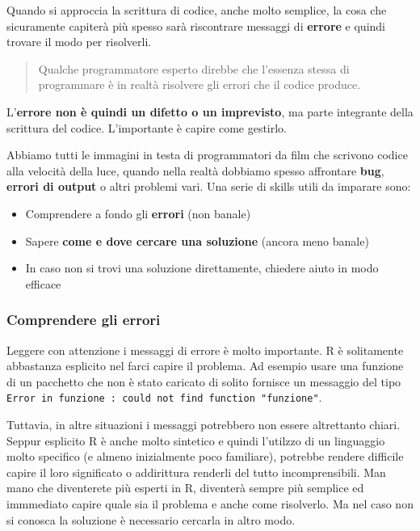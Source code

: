 \documentclass[
]{book}
\providecommand{\tightlist}{%
  \setlength{\itemsep}{0pt}\setlength{\parskip}{0pt}}
\begin{document}
Quando si approccia la scrittura di codice, anche molto semplice, la cosa che sicuramente capiterà più spesso sarà riscontrare messaggi di \textbf{errore} e quindi trovare il modo per risolverli.

\begin{quote}
Qualche programmatore esperto direbbe che l'essenza stessa di programmare è in realtà risolvere gli errori che il codice produce.
\end{quote}

L'\textbf{errore non è quindi un difetto o un imprevisto}, ma parte integrante della scrittura del codice. L'importante è capire come gestirlo.

Abbiamo tutti le immagini in testa di programmatori da film che scrivono codice alla velocità della luce, quando nella realtà dobbiamo spesso affrontare \textbf{bug}, \textbf{errori di output} o altri problemi vari. Una serie di skills utili da imparare sono:

\begin{itemize}
\tightlist
\item
  Comprendere a fondo gli \textbf{errori} (non banale)
\item
  Sapere \textbf{come e dove cercare una soluzione} (ancora meno banale)
\item
  In caso non si trovi una soluzione direttamente, chiedere aiuto in modo efficace
\end{itemize}

\hypertarget{comprendere-gli-errori}{%
\subsubsection*{Comprendere gli errori}\label{comprendere-gli-errori}}

Leggere con attenzione i messaggi di errore è molto importante. R è solitamente abbastanza esplicito nel farci capire il problema. Ad esempio usare una funzione di un pacchetto che non è stato caricato di solito fornisce un messaggio del tipo \texttt{Error\ in\ funzione\ :\ could\ not\ find\ function\ "funzione"}.

Tuttavia, in altre situazioni i messaggi potrebbero non essere altrettanto chiari. Seppur esplicito R è anche molto sintetico e quindi l'utilzzo di un linguaggio molto specifico (e almeno inizialmente poco familiare), potrebbe rendere difficile capire il loro significato o addirittura renderli del tutto incomprensibili. Man mano che diventerete più esperti in R, diventerà sempre più semplice ed immmediato capire quale sia il problema e anche come risolverlo. Ma nel caso non si conosca la soluzione è necessario cercarla in altro modo.
\end{document}
